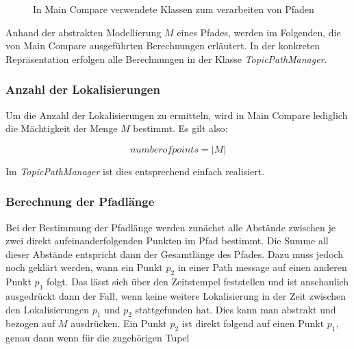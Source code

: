 \begin{figure}[t]
  \begin{center}
  \end{center}
  \caption{In Main Compare verwendete Klassen zum verarbeiten von Pfaden}
  \label{fig:topicpathrelated}
\end{figure}

Anhand der abstrakten Modellierung $M$ eines Pfades, werden im Folgenden, die von
Main Compare ausgeführten Berechnungen erläutert. In der konkreten
Repräsentation erfolgen alle Berechnungen in der Klasse \textit{TopicPathManager}. 

\subsubsection{Anzahl der Lokalisierungen}
Um die Anzahl der Lokalisierungen zu ermitteln, wird in Main Compare lediglich die
Mächtigkeit der Menge $M$ bestimmt. Es gilt also:

\begin{equation*}
  \label{eqn:numofpoints}
  number of points = \vert M \vert
\end{equation*}

Im \textit{TopicPathManager} ist dies entsprechend einfach realisiert.

\subsubsection{Berechnung der Pfadlänge}
Bei der Bestimmung der Pfadlänge werden zunächst alle Abstände zwischen je
zwei direkt aufeinanderfolgenden Punkten im Pfad bestimmt. Die Summe all dieser
Abstände entspricht dann der Gesamtlänge des Pfades. Dazu muss jedoch noch
geklärt werden, wann ein Punkt $p_2$ in einer Path message auf einen anderen
Punkt $p_1$ folgt. Das lässt sich über den Zeitstempel feststellen und ist
anschaulich ausgedrückt dann der Fall, wenn keine weitere Lokalisierung in
der Zeit zwischen den Lokalisierungen $p_1$ und $p_2$ stattgefunden hat. Dies
kann man abstrakt und bezogen auf $M$ ausdrücken.  Ein Punkt $p_2$ ist direkt
folgend auf einen Punkt $p_1$, genau dann wenn für die zugehörigen Tupel

